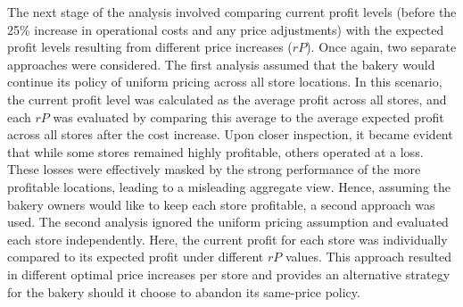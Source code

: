 The next stage of the analysis involved comparing current profit levels (before the 25\% increase in operational costs and any price adjustments) with the expected profit levels resulting from different price increases (\( rP \)). Once again, two separate approaches were considered. The first analysis assumed that the bakery would continue its policy of uniform pricing across all store locations. In this scenario, the current profit level was calculated as the average profit across all stores, and each \( rP \) was evaluated by comparing this average to the average expected profit across all stores after the cost increase. Upon closer inspection, it became evident that while some stores remained highly profitable, others operated at a loss. These losses were effectively masked by the strong performance of the more profitable locations, leading to a misleading aggregate view.  Hence, assuming the bakery owners would like to keep each store profitable, a second approach was used. The second analysis ignored the uniform pricing assumption and evaluated each store independently. Here, the current profit for each store was individually compared to its expected profit under different \( rP \) values. This approach resulted in different optimal price increases per store and provides an alternative strategy for the bakery should it choose to abandon its same-price policy.

